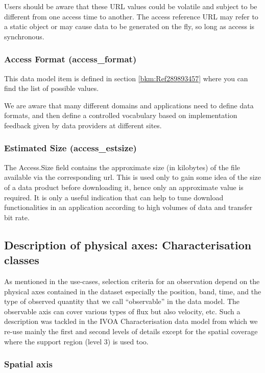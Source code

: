 \documentclass[11pt,a4paper]{ivoa}
\begin{document}
Users should be aware that these URL values could be volatile and subject to be different from one access time to
another.  The access reference URL may refer to a static object or may cause data to be generated on the fly, so long
as access is synchronous.

\subsubsection{Access Format (access\_format)}
\label{bkm:Ref297463580}This data model item is defined in section \ref{bkm:Ref289893457} where you can find the list of
possible values.

We are aware that many different domains and applications need to define data formats, and then define a controlled
vocabulary based on implementation feedback given by data providers at different sites.

\subsubsection{Estimated Size (access\_estsize)}
The Access.Size field contains the approximate size (in kilobytes) of the file available via the corresponding url. 
This is used only to gain some idea of the size of a data product before downloading it, hence only an approximate
value is required. It is only a useful indication that can help to tune download functionalities in an application
according to high volumes of data and transfer bit rate. 

\subsection{Description of physical axes: Characterisation classes}
As mentioned in the use-cases, selection criteria for an observation depend on the physical axes contained in the
dataset especially the position, band, time, and the type of observed quantity that we call ``observable'' in the data
model. The observable axis can cover various types of flux but also velocity, etc.  Such a description was tackled in
the IVOA Characterisation data model \cite{2008ivoa.spec.0325L} from which we re-use mainly the first and second levels
of details except for the spatial coverage where the support region (level 3) is used too.  

\subsubsection{Spatial axis}
\end{document}
